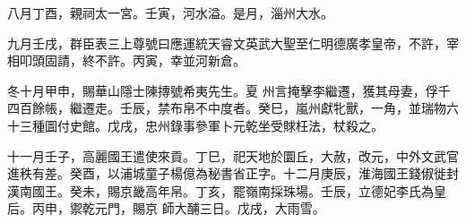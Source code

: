 \begin{pinyinscope}
 八月丁酉，親祠太一宮。壬寅，河水溢。是月，淄州大水。



 九月壬戌，群臣表三上尊號曰應運統天睿文英武大聖至仁明德廣孝皇帝，不許，宰相叩頭固請，終不許。丙寅，幸並河新倉。



 冬十月甲申，賜華山隱士陳摶號希夷先生。夏
 州言掩擊李繼遷，獲其母妻，俘千四百餘帳，繼遷走。壬辰，禁布帛不中度者。癸巳，嵐州獻牝獸，一角，並瑞物六十三種圖付史館。戊戌，忠州錄事參軍卜元乾坐受賕枉法，杖殺之。



 十一月壬子，高麗國王遣使來貢。丁巳，祀天地於圜丘，大赦，改元，中外文武官進秩有差。癸酉，以浦城童子楊億為秘書省正字。十二月庚辰，淮海國王錢俶徙封漢南國王。癸未，賜京畿高年帛。丁亥，罷嶺南採珠場。壬辰，立德妃李氏為皇后。丙申，禦乾元門，賜京
 師大酺三日。戊戌，大雨雪。



\end{pinyinscope}